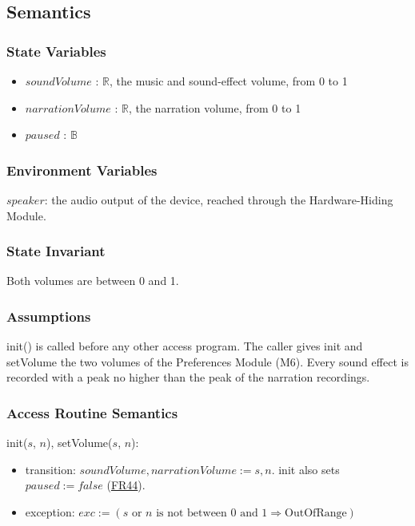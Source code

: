 \documentclass[10pt, titlepage]{article}
\newcommand{\srsurl}{https://team-hindsight.github.io/ophthamology-game/SRS/SRS.pdf}
\newcommand{\srsitemref}[2]{\href{\srsurl\#nameddest=#1}{#2}}
\newcommand{\B}{\mathbb{B}}
\newcommand{\R}{\mathbb{R}}
\newcommand{\T}[1]{\mathit{#1}}          %
\newcommand{\exc}{\mathit{exc}}
\newcommand{\false}{\mathit{false}}
\begin{document}
\subsection{Semantics}

\subsubsection{State Variables}

\begin{itemize}
\item $\T{soundVolume}$ : $\R$, the music and sound-effect volume, from 0 to 1
\item $\T{narrationVolume}$ : $\R$, the narration volume, from 0 to 1
\item $\T{paused}$ : $\B$
\end{itemize}

\subsubsection{Environment Variables}

$\T{speaker}$: the audio output of the device, reached through the
Hardware-Hiding Module.

\subsubsection{State Invariant}

Both volumes are between 0 and 1.

\subsubsection{Assumptions}

init() is called before any other access program. The caller gives init and
setVolume the two volumes of the Preferences Module (M6). Every sound effect is
recorded with a peak no higher than the peak of the narration recordings.

\subsubsection{Access Routine Semantics}

\noindent init($s$, $n$), setVolume($s$, $n$):
\begin{itemize}
\item transition: $\T{soundVolume}, \T{narrationVolume} := s, n$. init also
  sets $\T{paused} := \false$ (\srsitemref{FR_Preferences}{FR44}).
\item exception: $\exc := (s \text{ or } n \text{ is not between 0 and 1}
  \Rightarrow \text{OutOfRange})$
\end{itemize}
\end{document}
